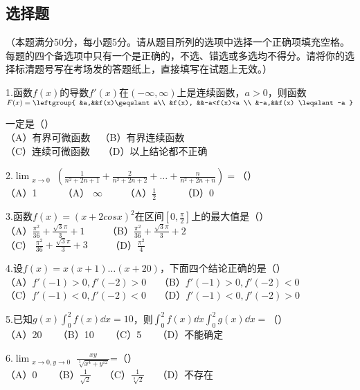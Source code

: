 


\subsection{选择题}（本题满分50分，每小题5分。请从题目所列的选项中选择一个正确项填充空格。每题的四个备选项中只有一个是正确的，不选、错选或多选均不得分。请将你的选择标清题号写在考场发的答题纸上，直接填写在试题上无效。）

1.函数$f(x)$的导数$f'(x)$在$(-\infty,\infty)$上是连续函数，$a>0$，则函数$F(x)=\leftgroup{
&a,&&f(x)\geqslant a\\ 
&f(x), &&-a<f(x)<a \\
&-a,&&f(x) \leqslant -a }$

一定是（）\\
（A）有界可微函数$\quad$（B）有界连续函数 \\
（C）连续可微函数$\quad$ （D）以上结论都不正确

2.$\displaystyle \lim_{\substack{x \to 0}}(\frac{1}{n^2+2n+1}+\frac{2}{n^2+2n+2}+\dots+\frac{n}{n^2+2n+n})=$（）\\
（A）1 $\qquad$ （A） $ \infty \qquad$  （A）$\frac{1}{2}$ $\qquad$   （D）0

3.函数$f(x)=(x+2cosx)^2$在区间$[0,\frac{\pi}{2}]$上的最大值是（）\\
（A）$\frac{\pi ^2}{36}+\frac{\sqrt{3}\pi}{3}+1 \qquad$     （B）$\frac{\pi ^2}{36}+\frac{\sqrt{3}\pi}{3}+2 \qquad$  \\
（C） $\frac{\pi ^2}{36}+\frac{\sqrt{3}\pi}{3}+3\qquad$       （D）$\frac{\pi^2}{4} \qquad$  

4.设$f(x)=x(x+1)\dots(x+20)$，下面四个结论正确的是（）\\
（A）$f'(-1)>0,f'(-2)>0\quad$ （B）$f'(-1)>0,f'(-2)<0\quad$ \\
（C）$f'(-1)<0,f'(-2)<0\quad$ （D）$f'(-1)<0,f'(-2)>0$

5.已知$\displaystyle g(x)\int_{0}^{2} f(x)\dd{x}=10$，则$\displaystyle \int_{0}^{2} f(x)\dd{x} \int_{0}^{2} g(x)\dd{x}=$（）\\
（A）20 $\quad$ （B）10 $\quad$ （C）5 $\quad$ （D）不能确定

6.$ \displaystyle \lim_{\substack{x \to 0,y \to 0}} \frac{xy}{\sqrt[3]{x^4+y^{12}}}$=（）\\
（A）0 $\quad$ （B）$\frac{1}{\sqrt{2}} \quad$ （C）$ \frac{1}{\sqrt[3]{2}}\quad$ （D）不存在  

